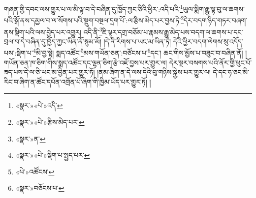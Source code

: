 གཞན་གྱི་དབང་ལས་གྱུར་པ་ལ་མི་ལྟ་བ་དེ་བཞིན་དུ་ཁྱོད་ཀྱང་ཅིའི་ཕྱིར་:འདི་པའི་\footnote{«སྣར་»«པེ་»འདི་}ཡུལ་སྨིག་རྒྱུ་ལྟ་བུ་ལ་ཆགས་པའི་སྒོ་ནས་དམྱལ་བ་ལ་སོགས་པའི་སྡུག་བསྔལ་དྲག་པོ་:ལ་རྩིས་མེད་པར་བྱས་ཏེ་\footnote{«སྣར་»«པེ་»རྩིས་མེད་པར་}དེར་བདག་ཉིད་གཏར་བཞག་ནས་སྡིག་པའི་ལས་བྱེད་པར་འགྱུར། འདི་ནི་\footnote{«སྣར་»ན་}ཇི་ལྟར་དགྲ་བཅོམ་པ་རྣམས་རྒྱུ་མེད་པས་བདག་ལ་ཆགས་པ་དང་བྲལ་བ་དེ་བཞིན་དུ་ཁྱོད་ཀྱང་ཡིན་ནོ་སྙམ་མོ། །དེ་ནི་རིགས་པ་ཡང་མ་ཡིན་ཏེ། དེའི་ཕྱིར་བདག་ལེགས་སུ་འདོད་པས་:སྡིག་པ་\footnote{«སྣར་»«པེ་»སྡིག་པ་སྤྱད་པར་}མི་བྱ་སྟེ། སྨད་འཚོང་\footnote{«པེ་»འཚོངས་}མས་གཡོན་ཅན་:བཙོངས་པ་\footnote{«སྣར་»བཅོངས་པ་}དང་། ཆང་གིས་མྱོས་པ་བཟུང་བ་བཞིན་ནོ། །གཡོན་ཅན་ཁ་ཅིག་གིས་སྨད་འཚོང་དང་ལྷན་ཅིག་རྩེ་འཇོ་བྱས་པར་གྱུར་ལ། དེར་སྔར་བསགས་པའི་ནོར་གྱི་ཕུང་པོ་ཟད་པས་དེ་ལ་ཅི་ཡང་མ་བྱིན་པར་གྱུར་ཏོ། །ནམ་ཞིག་ན་དེ་ལས་དེའི་བུ་གཉིས་སྐྱེས་པར་གྱུར་ལ། དེ་དང་ཧ་ཅང་མི་རིང་བ་ཞིག་ན་ཚོང་དཔོན་འགྲོན་པོ་ཞིག་གི་ཁྱིམ་ཡོད་པར་གྱུར་ཏོ། །
